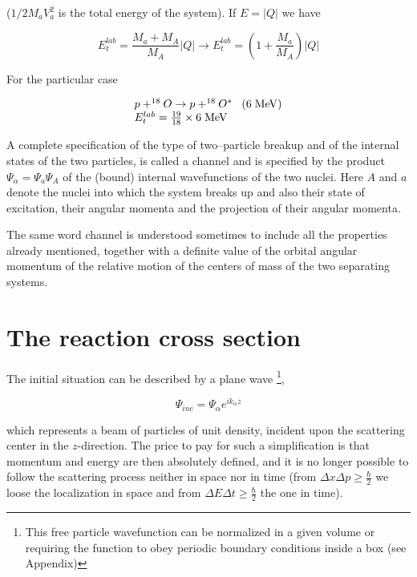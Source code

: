 \noindent ($1/2 M_a V_a^2$ is the total energy of the system). If $E=|Q|$ we have

\begin{equation}
E_t^{lab} = \frac{M_a + M_A}{M_A} |Q| \rightarrow E_t^{lab} = \left( 1+ \frac{M_a}{M_A} \right)  |Q|
\end{equation}

\noindent For the particular case

\begin{equation}
\begin{array}{l}
p + ^{18}O \rightarrow p + ^{18}O^* \;\;\; (6 \;{\rm MeV}) \\
E_t^{lab} = \frac{19}{18} \times 6 \;{\rm MeV}
\end{array}
\end{equation}

A complete specification of the type of two--particle breakup and of the internal states of the two particles, is called a channel and is specified by the product $\Psi_{\alpha} = \Psi_a \Psi_A$ of the (bound) internal wavefunctions of the two nuclei. Here $A$ and $a$ denote the nuclei into which the system breaks up and also their state of excitation, their angular momenta and the projection of their angular momenta.

The same word channel is understood sometimes to include all the properties already mentioned, together with a definite value of the orbital angular momentum of the relative motion of the centers of mass of the two separating systems.


\section{The reaction cross section}

The initial situation can be described by a plane wave \footnote{This free particle wavefunction can be normalized in a given volume or requiring the function to obey periodic boundary conditions inside a box (see Appendix)},

\begin{equation}
\Psi_{inc} = \Psi_{\alpha} e^{i k_{\alpha} z}
\label{eqn:psi_inc}
\end{equation}

\noindent which represents a beam of particles of unit density, incident upon the scattering center in the $z$-direction. The price to pay for such a simplification is that momentum and energy are then absolutely defined, and it is no longer possible to follow the scattering process neither in space nor in time (from $\Delta x \Delta p \ge \frac{\hbar}{2}$ we loose the localization in space and from $\Delta E \Delta t \ge \frac{\hbar}{2}$ the one in time).

